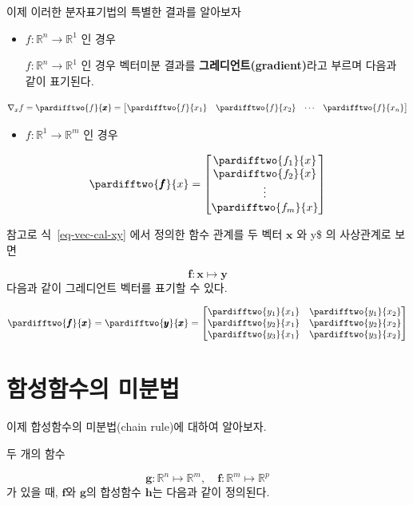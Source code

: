 \documentclass[
  11pt,
  a4paper,
  oneside]{scrbook}
\providecommand{\tightlist}{%
  \setlength{\itemsep}{0pt}\setlength{\parskip}{0pt}}\usepackage{longtable,booktabs,array}
\newcommand{\RR}{\mathbb{R}}
\theoremstyle{definition}
\theoremstyle{definition}
\theoremstyle{plain}
\theoremstyle{remark}
\begin{document}
이제 이러한 분자표기법의 특별한 결과를 알아보자

\begin{itemize}
\item
  \(f: \RR^n \rightarrow \RR^1\) 인 경우

  \(f: \RR^n \rightarrow \RR^1\) 인 경우 벡터미분 결과를
  \textbf{그레디언트(gradient)}라고 부르며 다음과 같이 표기된다.
\end{itemize}

\[ 
\nabla_x f = \pardifftwo{ f}{\pmb x} = 
\begin{bmatrix} \pardifftwo{ f}{x_1} & \pardifftwo{ f}{x_2} & \cdots & \pardifftwo{ f}{x_n} \end{bmatrix} 
\]

\begin{itemize}
\tightlist
\item
  \(f: \RR^1 \rightarrow \RR^m\) 인 경우
\end{itemize}

\[ 
\pardifftwo{\pmb f}{x} = 
\begin{bmatrix} 
\pardifftwo{ f_1}{x} \\
\pardifftwo{ f_2}{x} \\
\vdots \\
\pardifftwo{ f_m}{x} 
\end{bmatrix} 
\]

참고로 식~\ref{eq-vec-cal-xy} 에서 정의한 함수 관계를 두 벡터 \(\pmb x\)
와 \pmb y\$ 의 사상관계로 보면

\[ \pmb f : \pmb x \mapsto \pmb y \] 다음과 같이 그레디언트 벡터를
표기할 수 있다.

\[  \pardifftwo{ \pmb f}{\pmb x} = \pardifftwo{ \pmb y}{\pmb x}
=
\begin{bmatrix}
\pardifftwo{  y_1}{ x_1} &  \pardifftwo{  y_1}{ x_2}  \\
\pardifftwo{  y_2}{ x_1} &  \pardifftwo{  y_2}{ x_2}  \\
\pardifftwo{  y_3}{ x_1} &  \pardifftwo{  y_3}{ x_2}
\end{bmatrix}
\]

\section{함성함수의
미분법}\label{uxd568uxc131uxd568uxc218uxc758-uxbbf8uxbd84uxbc95}

이제 합성함수의 미분법(chain rule)에 대하여 알아보자.

두 개의 함수

\[
\pmb g :\RR^n \mapsto \RR^m, \quad \pmb f :\RR^m \mapsto \RR^p
\] 가 있을 때, \(\pmb f\)와 \(\pmb g\)의 합성함수 \(\pmb h\)는 다음과
같이 정의된다.
\end{document}
